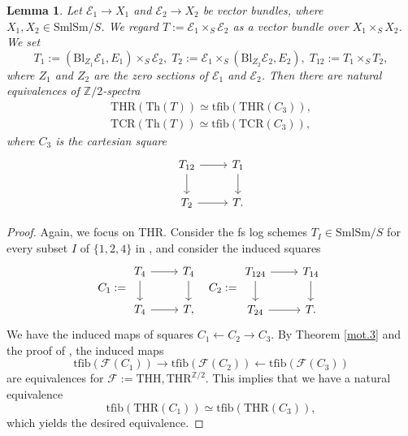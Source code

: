 \documentclass[10pt]{amsart}
\newtheorem{lem}[thm]{Lemma}
\theoremstyle{definition}
\theoremstyle{remark}
\numberwithin{equation}{section}
\newcommand{\Z}{\mathbb{Z}}
\newcommand{\cE}{\mathcal{E}}
\newcommand{\cF}{\mathcal{F}}
\newcommand{\SmlSm}{\mathrm{SmlSm}}
\newcommand{\tfib}{\mathrm{tfib}}
\newcommand{\Blow}{\mathrm{Bl}}
\newcommand{\Th}{\mathrm{Th}}
\newcommand{\THH}{\mathrm{THH}}
\newcommand{\THR}{\mathrm{THR}}
\newcommand{\TCR}{\mathrm{TCR}}
\newcommand{\Ztwo}{{\mathbb{Z}/2}}
\begin{document}
\begin{lem}
\label{mot.16}
Let $\cE_1\to X_1$ and $\cE_2\to X_2$ be vector bundles,
where $X_1,X_2\in \SmlSm/S$.
We regard $T:=\cE_1\times_S \cE_2$ as a vector bundle over $X_1\times_S X_2$.
We set
\[
T_1:=(\Blow_{Z_1} \cE_1,E_1)\times_S \cE_2,
\;
T_2:=\cE_1\times_S (\Blow_{Z_2}\cE_2,E_2),
\;
T_{12}:=T_1\times_S T_2,
\]
where $Z_1$ and $Z_2$ are the zero sections of $\cE_1$ and $\cE_2$.
Then there are natural equivalences of $\Ztwo$-spectra
\begin{gather*}
\THR(\Th(T))
\simeq
\tfib(\THR(C_3)),
\\
\TCR(\Th(T))
\simeq
\tfib(\TCR(C_3)),
\end{gather*}
where $C_3$ is the cartesian square
\[
\begin{tikzcd}
T_{12}\ar[d]\ar[r]&
T_1\ar[d]
\\
T_2\ar[r]&
T.
\end{tikzcd}
\]
\end{lem}
\begin{proof}
Again,
we focus on $\THR$.
Consider the fs log schemes $T_I\in \SmlSm/S$ for every subset $I$ of $\{1,2,4\}$ in \cite[Construction 7.4.14]{logDM},
and consider the induced squares
\[
C_1:=
\begin{tikzcd}
T_4\ar[d]\ar[r]&
T_4\ar[d]
\\
T_4\ar[r]&
T,
\end{tikzcd}
\;\;\;
C_2:=
\begin{tikzcd}
T_{124}\ar[d]\ar[r]&
T_{14}\ar[d]
\\
T_{24}\ar[r]&
T.
\end{tikzcd}
\]
We have the induced maps of squares $C_1\leftarrow C_2\to C_3$.
By Theorem \ref{mot.3} and the proof of \cite[Proposition 7.4.15]{logDM},
the induced maps
\[
\tfib(\cF(C_1))\to \tfib(\cF(C_2))\leftarrow \tfib(\cF(C_3))
\]
are equivalences for $\cF:=\THH,\THR^{\Z/2}$.
This implies that we have a natural equivalence
\[
\tfib(\THR(C_1))\simeq \tfib(\THR(C_3)),
\]
which yields the desired equivalence.
\end{proof}
\end{document}
